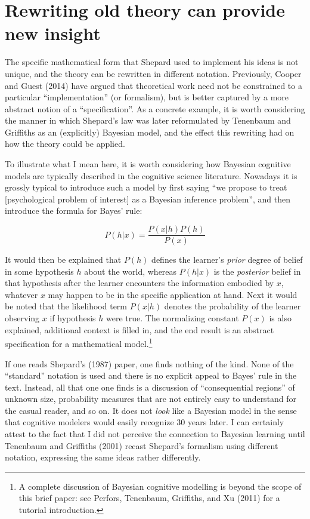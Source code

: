 \documentclass[
  english,
  doc]{apa6}
\begin{document}
\hypertarget{rewriting-old-theory-can-provide-new-insight}{%
\section{Rewriting old theory can provide new insight}\label{rewriting-old-theory-can-provide-new-insight}}

\noindent
The specific mathematical form that Shepard used to implement his ideas is not unique, and the theory can be rewritten in different notation. Previously, Cooper and Guest (2014) have argued that theoretical work need not be constrained to a particular \enquote{implementation} (or formalism), but is better captured by a more abstract notion of a \enquote{specification}. As a concrete example, it is worth considering the manner in which Shepard's law was later reformulated by Tenenbaum and Griffiths as an (explicitly) Bayesian model, and the effect this rewriting had on how the theory could be applied.

To illustrate what I mean here, it is worth considering how Bayesian cognitive models are typically described in the cognitive science literature. Nowadays it is grossly typical to introduce such a model by first saying \enquote{we propose to treat {[}psychological problem of interest{]} as a Bayesian inference problem}, and then introduce the formula for Bayes' rule:

\begin{equation}
P(h | x) = \frac{P(x | h) P(h)}{P(x)}
\end{equation}

\noindent
It would then be explained that \(P(h)\) defines the learner's \emph{prior} degree of belief in some hypothesis \(h\) about the world, whereas \(P(h|x)\) is the \emph{posterior} belief in that hypothesis after the learner encounters the information embodied by \(x\), whatever \(x\) may happen to be in the specific application at hand. Next it would be noted that the likelihood term \(P(x|h)\) denotes the probability of the learner observing \(x\) if hypothesis \(h\) were true. The normalizing constant \(P(x)\) is also explained, additional context is filled in, and the end result is an abstract specification for a mathematical model.\footnote{A complete discussion of Bayesian cognitive modelling is beyond the scope of this brief paper: see Perfors, Tenenbaum, Griffiths, and Xu (2011) for a tutorial introduction.}

If one reads Shepard's (1987) paper, one finds nothing of the kind. None of the \enquote{standard} notation is used and there is no explicit appeal to Bayes' rule in the text. Instead, all that one one finds is a discussion of \enquote{consequential regions} of unknown size, probability measures that are not entirely easy to understand for the casual reader, and so on. It does not \emph{look} like a Bayesian model in the sense that cognitive modelers would easily recognize 30 years later. I can certainly attest to the fact that I did not perceive the connection to Bayesian learning until Tenenbaum and Griffiths (2001) recast Shepard's formalism using different notation, expressing the same ideas rather differently.
\end{document}
